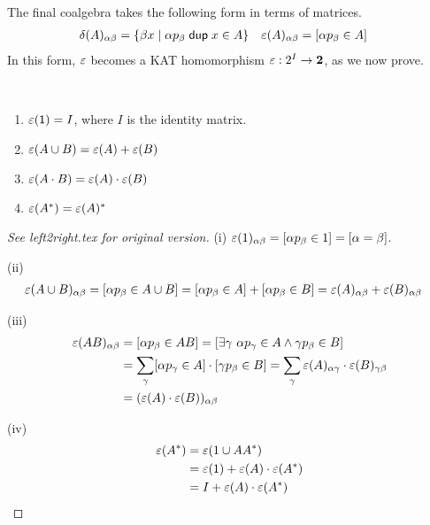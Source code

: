 \documentclass{article}
\renewcommand\smash{\mathrel{\diamond}}
\newcommand\ssum{\mathop{\textstyle\sum}}
\newcommand\Two{\mathbf{2}}
\newcommand\bval[1]{[#1]}
\renewcommand\star{^*}
\renewcommand\powerset[1]{2^{#1}}
\newcommand{\kw}[1]{\ensuremath{\mathsf{#1}}}
\newcommand{\pdup}{\ensuremath{\mathrel{\kw{dup}}}}
\newcommand{\id}{\kw{1}}
\begin{document}
The final coalgebra takes the following form in terms of matrices.
\begin{align*}
\delta(A)_{\alpha\beta} &= \set{\beta x}{\alpha p_\beta\pdup x\in A}
&
\eps(A)_{\alpha\beta} &= \bval{\alpha p_\beta\in A}
\end{align*}
In this form, $\varepsilon$ becomes a KAT homomorphism $\eps:\powerset I\to\Two$, as we now prove.
\begin{lemma}\ 
\begin{enumerate}
\romanize
\item
$\eps(\id) = I$, where $I$ is the identity matrix.
\item
$\varepsilon(A\cup B) = \varepsilon(A) + \varepsilon(B)$
\item
$\varepsilon(A\cdot B) = \varepsilon(A)\cdot\varepsilon(B)$
\item
$\eps(A\star) = \eps(A)\star$
\end{enumerate}
\end{lemma}

\begin{proof}
[See left2right.tex for original version]

(i) $\eps(1)_{\alpha\beta} = \bval{\alpha p_\beta\in 1} = \bval{\alpha=\beta}$.

(ii)
\begin{align*}
\eps(A\cup B)_{\alpha\beta}
&= \bval{\alpha p_\beta\in A\cup B}
= \bval{\alpha p_\beta\in A} + \bval{\alpha p_\beta\in B}
= \eps(A)_{\alpha\beta} + \eps(B)_{\alpha\beta}
\end{align*}

(iii)
\begin{align*}
\eps(AB)_{\alpha\beta}
&= \bval{\alpha p_\beta\in AB}
= \bval{\exists \gamma\ \alpha p_\gamma\in A\meet\gamma p_\beta\in B}\\
&= \sum_\gamma \bval{\alpha p_\gamma\in A}\cdot\bval{\gamma p_\beta\in B}
= \sum_\gamma\eps(A)_{\alpha\gamma}\cdot\eps(B)_{\gamma\beta}\\
&= (\eps(A)\cdot\eps(B))_{\alpha\beta}
\end{align*}

(iv)
\begin{align*}
\eps(A\star)
&= \eps(1\cup AA\star)\\
&= \eps(1) + \eps(A)\cdot\eps(A\star)\\
&= I + \eps(A)\cdot\eps(A\star)
\end{align*}
\end{proof}
\end{document}
